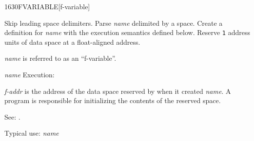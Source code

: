 \begin{newword}{1630}{FVARIABLE}[f-variable]

	Skip leading space delimiters. Parse \emph{name} delimited by a
	space. Create a definition for \emph{name} with the execution
	semantics defined below. Reserve \texttt{1} 
	address units of data space at a float-aligned address.

	\emph{name} is referred to as an ``f-variable''.

\item[\emph{name} Execution:]

	\emph{f-addr} is the address of the data space reserved by
	 when it created \emph{name}. A program is
	responsible for initializing the contents of the reserved
	space.

\item[See:]
	.

	\begin{rationale} %
		Typical use:
			 \emph{name}
	\end{rationale}
\end{newword}


